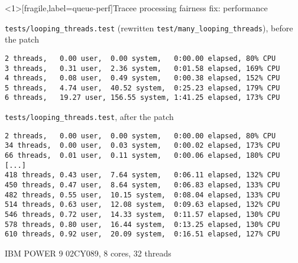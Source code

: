 \documentclass[unicode]{beamer}
\begin{document}
\begin{frame}<1>[fragile,label=queue-perf]{Tracee processing fairness fix: performance}
\begin{block}{\large \texttt{tests/looping\_threads.test} (rewritten \texttt{test/many\_looping\_threads}), before the patch}
\begin{scriptsize}
\begin{verbatim}
2 threads,   0.00 user,  0.00 system,   0:00.00 elapsed, 80% CPU
3 threads,   0.31 user,  2.36 system,   0:01.58 elapsed, 169% CPU
4 threads,   0.08 user,  0.49 system,   0:00.38 elapsed, 152% CPU
5 threads,   4.74 user,  40.52 system,  0:25.23 elapsed, 179% CPU
6 threads,   19.27 user, 156.55 system, 1:41.25 elapsed, 173% CPU
\end{verbatim}
\end{scriptsize}
\end{block}
\pause
\begin{block}{\large \texttt{tests/looping\_threads.test}, after the patch}
\begin{scriptsize}
\begin{verbatim}
2 threads,   0.00 user,  0.00 system,   0:00.00 elapsed, 80% CPU
34 threads,  0.00 user,  0.03 system,   0:00.02 elapsed, 173% CPU
66 threads,  0.01 user,  0.11 system,   0:00.06 elapsed, 180% CPU
[...]
418 threads, 0.43 user,  7.64 system,   0:06.11 elapsed, 132% CPU
450 threads, 0.47 user,  8.64 system,   0:06.83 elapsed, 133% CPU
482 threads, 0.55 user,  10.15 system,  0:08.04 elapsed, 133% CPU
514 threads, 0.63 user,  12.08 system,  0:09.63 elapsed, 132% CPU
546 threads, 0.72 user,  14.33 system,  0:11.57 elapsed, 130% CPU
578 threads, 0.80 user,  16.44 system,  0:13.25 elapsed, 130% CPU
610 threads, 0.92 user,  20.09 system,  0:16.51 elapsed, 127% CPU
\end{verbatim}
\end{scriptsize}
\end{block}
\begin{scriptsize}
IBM POWER 9 02CY089, 8 cores, 32 threads
\end{scriptsize}
\end{frame}

\end{document}
